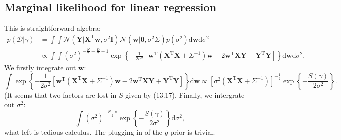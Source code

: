 \documentclass[UTF8]{ctexart}
\begin{document}
\subsection{Marginal likelihood for linear regression}
This is straightforward algebra:
$$
\begin{aligned}
p(\mathcal{D}|\gamma)&=\int\int\mathcal{N}(\textbf{Y}|\textbf{X}^{\text{T}}\textbf{w},\sigma^{2}\textbf{I})\mathcal{N}(\textbf{w}|\textbf{0},\sigma^{2}\Sigma)p(\sigma^{2})\text{d}\textbf{w}\text{d}\sigma^{2}\\
&\propto\int\int(\sigma^{2})^{-\frac{N}{2}-\frac{D}{2}-1}\exp\left\{-\frac{1}{2\sigma^{2}}\left[\textbf{w}^{\text{T}}(\textbf{X}^{\text{T}}\textbf{X}+\Sigma^{-1})\textbf{w}-2\textbf{w}^{\text{T}}\textbf{X}\textbf{Y}+\textbf{Y}^{\text{T}}\textbf{Y} \right] \right\}\text{d}\textbf{w}\text{d}\sigma^{2}.
\end{aligned}
$$
We firstly integrate out $\textbf{w}$:
$$\int \exp\left\{-\frac{1}{2\sigma^{2}}\left[\textbf{w}^{\text{T}}(\textbf{X}^{\text{T}}\textbf{X}+\Sigma^{-1})\textbf{w}-2\textbf{w}^{\text{T}}\textbf{X}\textbf{Y}+\textbf{Y}^{\text{T}}\textbf{Y} \right] \right\}\text{d}\textbf{w}\propto \left[\sigma^{2}(\textbf{X}^{\text{T}}\textbf{X}+\Sigma^{-1}) \right]^{-\frac{1}{2}}\exp\left\{-\frac{S(\gamma)}{2\sigma^{2}} \right\}.$$
(It seems that two factors are lost in $S$ given by (13.17).
Finally, we intergrate out $\sigma^{2}$:
$$\int (\sigma^{2})^{-\frac{N+a}{2}}\exp\left\{-\frac{S(\gamma)}{2\sigma^{2}} \right\}\text{d}\sigma^{2},$$
what left is tedious calculus.
The plugging-in of the $g$-prior is trivial.
\end{document}
